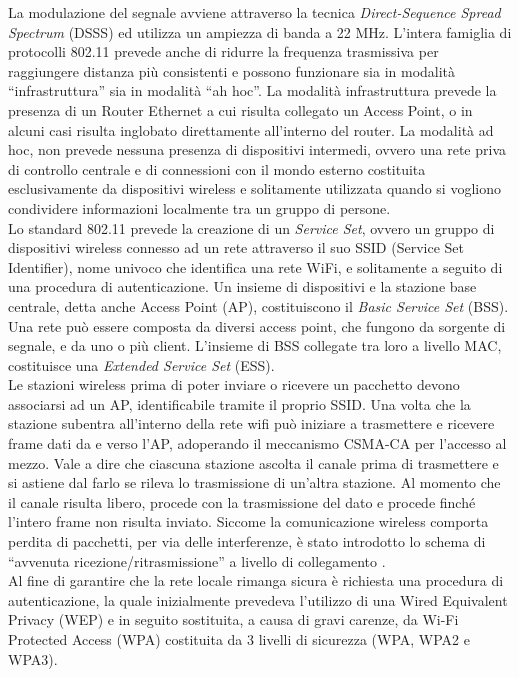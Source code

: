 La modulazione del segnale avviene attraverso la tecnica \textit{Direct-Sequence Spread Spectrum} (DSSS) ed utilizza un ampiezza di banda a 22 MHz. 
L'intera famiglia di protocolli 802.11 prevede anche di ridurre la frequenza trasmissiva per raggiungere distanza più consistenti e possono funzionare sia in modalità ``infrastruttura'' sia in modalità ``ah hoc''. La modalità infrastruttura prevede la presenza di un Router Ethernet a cui risulta collegato un Access Point, o in alcuni casi risulta inglobato direttamente all'interno del router. La modalità ad hoc, non prevede nessuna presenza di dispositivi intermedi, ovvero una rete priva di controllo centrale e di connessioni con il mondo esterno costituita esclusivamente da dispositivi wireless e solitamente utilizzata quando si vogliono condividere informazioni localmente tra un gruppo di persone.\\

\noindent Lo standard 802.11 prevede la creazione di un \textit{Service Set}, ovvero un gruppo di dispositivi wireless connesso ad un rete attraverso il suo SSID (Service Set Identifier), nome univoco che identifica una rete WiFi, e solitamente a seguito di una procedura di autenticazione. Un insieme di dispositivi e la stazione base centrale, detta anche Access Point (AP), costituiscono il \textit{Basic Service Set} (BSS). Una rete può essere composta da diversi access point, che fungono da sorgente di segnale, e da uno o più client. L'insieme di BSS collegate tra loro a livello MAC, costituisce una \textit{Extended Service Set} (ESS).\\
Le stazioni wireless prima di poter inviare o ricevere un pacchetto devono associarsi ad un AP, identificabile tramite il proprio SSID. Una volta che la stazione subentra all'interno della rete wifi può iniziare a trasmettere e ricevere frame dati da e verso l'AP, adoperando il meccanismo CSMA-CA per l'accesso al mezzo. Vale a dire che ciascuna stazione ascolta il canale prima di trasmettere e si astiene dal farlo se rileva lo trasmissione di un'altra stazione. Al momento che il canale risulta libero, procede con la trasmissione del dato e procede finché l'intero frame non risulta inviato. Siccome la comunicazione wireless comporta perdita di pacchetti, per via delle interferenze, è stato introdotto lo schema di ``avvenuta ricezione/ritrasmissione'' a livello di collegamento \cite{kurose2013reti}.\\
Al fine di garantire che la rete locale rimanga sicura è richiesta una procedura di autenticazione, la quale inizialmente prevedeva l'utilizzo di una Wired Equivalent Privacy (WEP) e in seguito sostituita, a causa di gravi carenze, da Wi-Fi Protected Access (WPA) costituita da 3 livelli di sicurezza (WPA, WPA2 e WPA3).\\

